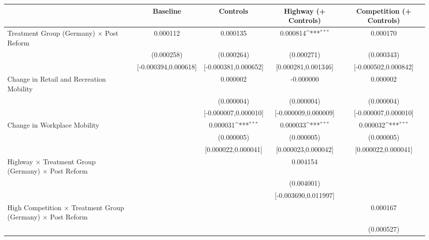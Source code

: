 {
\def\sym#1{\ifmmode^{#1}\else\(^{#1}\)\fi}
\begin{tabular}{l*{4}{c}}
\toprule
                    &\multicolumn{1}{c}{Baseline}&\multicolumn{1}{c}{Controls}&\multicolumn{1}{c}{Highway (+ Controls)}&\multicolumn{1}{c}{Competition (+ Controls)}\\
\midrule
Treatment Group (Germany) $\times$ Post Reform&    0.000112         &    0.000135         &    0.000814\sym{***}&    0.000170         \\
                    &  (0.000258)         &  (0.000264)         &  (0.000271)         &  (0.000343)         \\
                    &[-0.000394,0.000618]         &[-0.000381,0.000652]         &[0.000281,0.001346]         &[-0.000502,0.000842]         \\
Change in Retail and Recreation Mobility&                     &    0.000002         &   -0.000000         &    0.000002         \\
                    &                     &  (0.000004)         &  (0.000004)         &  (0.000004)         \\
                    &                     &[-0.000007,0.000010]         &[-0.000009,0.000009]         &[-0.000007,0.000010]         \\
Change in Workplace Mobility&                     &    0.000031\sym{***}&    0.000033\sym{***}&    0.000032\sym{***}\\
                    &                     &  (0.000005)         &  (0.000005)         &  (0.000005)         \\
                    &                     &[0.000022,0.000041]         &[0.000023,0.000042]         &[0.000022,0.000041]         \\
Highway $\times$ Treatment Group (Germany) $\times$ Post Reform&                     &                     &    0.004154         &                     \\
                    &                     &                     &  (0.004001)         &                     \\
                    &                     &                     &[-0.003690,0.011997]         &                     \\
High Competition $\times$ Treatment Group (Germany) $\times$ Post Reform&                     &                     &                     &    0.000167         \\
                    &                     &                     &                     &  (0.000527)         \\

\end{tabular}}
